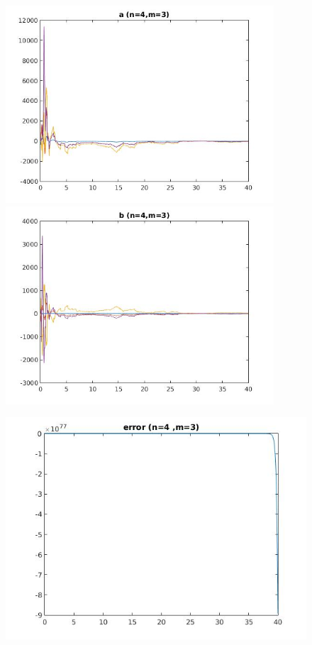 \documentclass{article}
\begin{document}
\clearpage
\large
\begin{figure}[h!]
\centering 
 	  \begin{minipage}{0.48\textwidth}
     \centering
     \advance\leftskip-4cm
  \includegraphics[width=100mm,scale=2]{assets/try43o.jpg}
   \end{minipage} \hfill
    \begin{minipage}{0.48\textwidth}
  \includegraphics[width=100mm,scale=2]{assets/try43oo.jpg}
  \end{minipage}
\end{figure}
\begin{figure}[h!]
\centering
\advance\leftskip-0.5cm
 \includegraphics[width=140mm,scale=2]{assets/try43ooo.jpg}
\end{figure}
\clearpage
\end{document}
